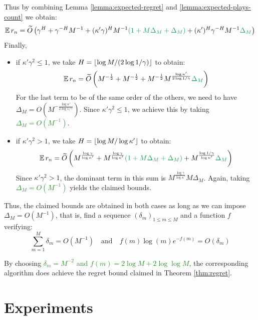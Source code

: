 \documentclass[runningheads, envcountsame, a4paper]{llncs}
\newcommand{\diff}[1]{\textcolor{ForestGreen}{#1}}
\begin{document}
Thus by combining Lemma \ref{lemma:expected-regret} and \ref{lemma:expected-plays-count} we obtain:
\begin{equation*}
    \expectedvalue r_n = \tilde{O}\left(\gamma^H + \gamma^{-H}M^{-1} + (\kappa' \gamma)^{H}M^{-1}\diff{(1+M\Delta_M+\Delta_M)} + (\kappa')^H\gamma^{-H}M^{-1}\diff{\Delta_M}\right)
\end{equation*}
Finally,
\begin{itemize}
    \item if $\kappa'\gamma^2 \leq 1$, we take $H = \lfloor\log M / (2\log 1/\gamma)\rfloor$ to obtain:
    \begin{equation*}
        \expectedvalue r_n = \tilde{O}\left(M^{-\frac{1}{2}} + M^{-\frac{1}{2}} + M^{-\frac{1}{2}}M^{\frac{\log \kappa'}{2\log 1/\gamma}} \diff{\Delta_M}\right)
    \end{equation*}
    For the last term to be of the same order of the others, we need to have $\Delta_M = O(M^{-\frac{\log \kappa'}{2\log 1/\gamma}})$. Since $\kappa'\gamma^2 \leq 1$, we achieve this by taking \diff{$\Delta_M = O(M^{-1})$}.
    \item if $\kappa'\gamma^2 > 1$, we take $H = \lfloor\log M / \log \kappa'\rfloor$ to obtain:
    \begin{equation*}
        \expectedvalue r_n = \tilde{O}\left(M^{\frac{\log \gamma}{\log \kappa'}} + M^{\frac{\log \gamma}{\log \kappa'}}\diff{(1+M\Delta_M+\Delta_M)} + M^{\frac{\log 1/\gamma}{\log \kappa'}}\diff{\Delta_M}\right)
    \end{equation*}
    Since $\kappa'\gamma^2 > 1$, the dominant term in this sum is $M^{\frac{\log \gamma}{\log \kappa'}}M\Delta_M$. Again, taking \diff{$\Delta_M = O(M^{-1})$} yields the claimed bounds.
\end{itemize}
Thus, the claimed bounds are obtained in both cases as long as we can impose $\Delta_M = O(M^{-1})$, that is, find a sequence $(\delta_m)_{1\leq m\leq M}$ and a function $f$ verifying:
\begin{equation}
    \sum_{m=1}^M \delta_m = O(M^{-1})\quad \text{and}\quad f(m)\log (m) e^{-f(m)} = O(\delta_m)
\end{equation}

By choosing \diff{$\delta_m = M^{-2}$ and $f(m) = 2 \log M + 2 \log\log M$}, the corresponding \KLOLOP algorithm does achieve the regret bound claimed in Theorem \ref{thm:regret}.


\section{Experiments}
\label{sec:experiments}
\end{document}
